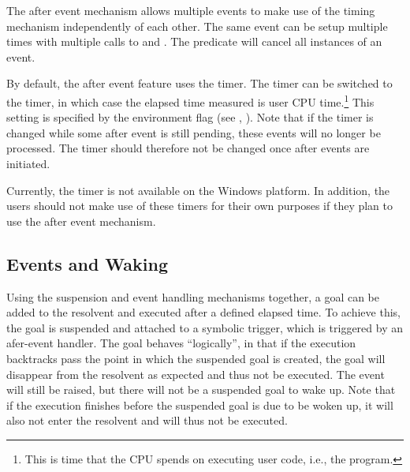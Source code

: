 The after event mechanism allows multiple events to make use of the timing
mechanism independently of each other. The same event can be setup
multiple times with multiple calls to  and
. The 
predicate will cancel all instances of an event.

By default, the after event feature uses the  timer. The
timer can be switched to the  timer, in which case the
elapsed time measured is user CPU time.\footnote{%
  This is time that the CPU spends on executing user code, i.e., the {\eclipse}
  program.}
This  setting is specified by the {\eclipse} environment flag
 (see ,
). Note that if the
timer is changed while some after event is still pending, these events
will no longer be processed. The timer should therefore not be changed
once after events are initiated.

Currently, the  timer is not available on the Windows
platform. In addition, the users should not make use of these
timers for their own purposes if they plan to use the after event
mechanism.


\subsection{Events and Waking}

Using the suspension and event handling mechanisms together, a goal can be
added to the resolvent and executed after a defined elapsed time.
To achieve this, the goal is suspended and attached to a symbolic
trigger, which is triggered by an afer-event handler.  The goal behaves
``logically'', in that if the execution backtracks pass the point in which
the suspended goal is created, the goal will disappear from the resolvent
as expected and thus not be executed. The event will still be raised, but
there will not be a suspended goal to wake up. Note that if the execution
finishes before the suspended goal is due to be woken up, it will also not
enter the resolvent and will thus not be executed.

